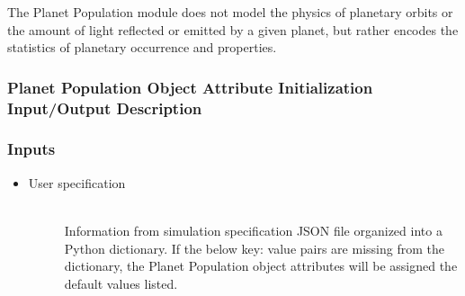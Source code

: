 \documentclass[cleanfoot]{asme2ej}
\begin{document}
The Planet Population module does not model the physics of planetary orbits or the amount of light reflected or emitted by a given planet, but rather encodes the statistics of planetary occurrence and properties. 

\label{sec:planetpopulation}
\subsubsection{Planet Population Object Attribute Initialization Input/Output Description} 
\subsubsection*{Inputs}
\begin{itemize}
    \item
    \begin{description}
        \item[User specification] \hfill \\ 
        Information from simulation specification JSON file organized into a Python dictionary. If the below key: value pairs are missing from the dictionary, the Planet Population object attributes will be assigned the default values listed.
\end{description}
\end{itemize}
\end{document}
